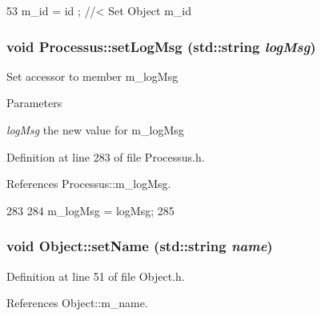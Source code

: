 \begin{DoxyCode}
53 { m_id    = id    ; } //< Set Object m_id
\end{DoxyCode}
\hypertarget{classProcessus_a471833f89047aa9a7ff6200a31c17a1d}{
\subsubsection[{setLogMsg}]{\setlength{\rightskip}{0pt plus 5cm}void Processus::setLogMsg (std::string {\em logMsg})}}
\label{classProcessus_a471833f89047aa9a7ff6200a31c17a1d}
Set accessor to member m\_\-logMsg 
\begin{DoxyParams}{Parameters}
\item[{\em logMsg}]the new value for m\_\-logMsg \end{DoxyParams}


Definition at line 283 of file Processus.h.

References Processus::m\_\-logMsg.


\begin{DoxyCode}
283                                     {
284     m_logMsg = logMsg;
285   }
\end{DoxyCode}
\hypertarget{classObject_ae30fea75683c2d149b6b6d17c09ecd0c}{
\subsubsection[{setName}]{\setlength{\rightskip}{0pt plus 5cm}void Object::setName (std::string {\em name})}}
\label{classObject_ae30fea75683c2d149b6b6d17c09ecd0c}


Definition at line 51 of file Object.h.

References Object::m\_\-name.

